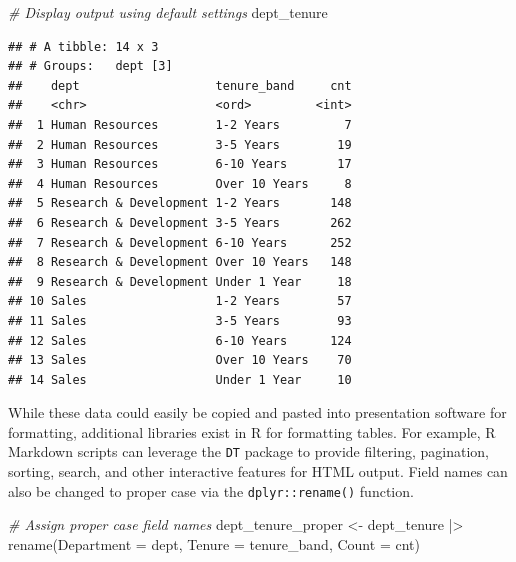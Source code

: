 \documentclass[
]{book}
\newenvironment{Shaded}{\begin{snugshade}}{\end{snugshade}}
\newcommand{\CommentTok}[1]{\textcolor[rgb]{0.56,0.35,0.01}{\textit{#1}}}
\newcommand{\FunctionTok}[1]{\textcolor[rgb]{0.00,0.00,0.00}{#1}}
\newcommand{\NormalTok}[1]{#1}
\newcommand{\OtherTok}[1]{\textcolor[rgb]{0.56,0.35,0.01}{#1}}
\newcommand{\SpecialCharTok}[1]{\textcolor[rgb]{0.00,0.00,0.00}{#1}}
\newcommand{\StringTok}[1]{\textcolor[rgb]{0.31,0.60,0.02}{#1}}
\begin{document}
\begin{Shaded}
\begin{Highlighting}[]
\CommentTok{\# Display output using default settings}
\NormalTok{dept\_tenure}
\end{Highlighting}
\end{Shaded}

\begin{verbatim}
## # A tibble: 14 x 3
## # Groups:   dept [3]
##    dept                   tenure_band     cnt
##    <chr>                  <ord>         <int>
##  1 Human Resources        1-2 Years         7
##  2 Human Resources        3-5 Years        19
##  3 Human Resources        6-10 Years       17
##  4 Human Resources        Over 10 Years     8
##  5 Research & Development 1-2 Years       148
##  6 Research & Development 3-5 Years       262
##  7 Research & Development 6-10 Years      252
##  8 Research & Development Over 10 Years   148
##  9 Research & Development Under 1 Year     18
## 10 Sales                  1-2 Years        57
## 11 Sales                  3-5 Years        93
## 12 Sales                  6-10 Years      124
## 13 Sales                  Over 10 Years    70
## 14 Sales                  Under 1 Year     10
\end{verbatim}

While these data could easily be copied and pasted into presentation software for formatting, additional libraries exist in R for formatting tables. For example, R Markdown scripts can leverage the \texttt{DT} package to provide filtering, pagination, sorting, search, and other interactive features for HTML output. Field names can also be changed to proper case via the \texttt{dplyr::rename()} function.

\begin{Shaded}
\begin{Highlighting}[]
\CommentTok{\# Assign proper case field names}
\NormalTok{dept\_tenure\_proper }\OtherTok{\textless{}{-}}\NormalTok{ dept\_tenure }\SpecialCharTok{|\textgreater{}}
                      \FunctionTok{rename}\NormalTok{(}\StringTok{\textquotesingle{}Department\textquotesingle{}} \OtherTok{=}\NormalTok{ dept,}
                             \StringTok{\textquotesingle{}Tenure\textquotesingle{}} \OtherTok{=}\NormalTok{ tenure\_band,}
                             \StringTok{\textquotesingle{}Count\textquotesingle{}} \OtherTok{=}\NormalTok{ cnt)}
\end{Highlighting}
\end{Shaded}
\end{document}
